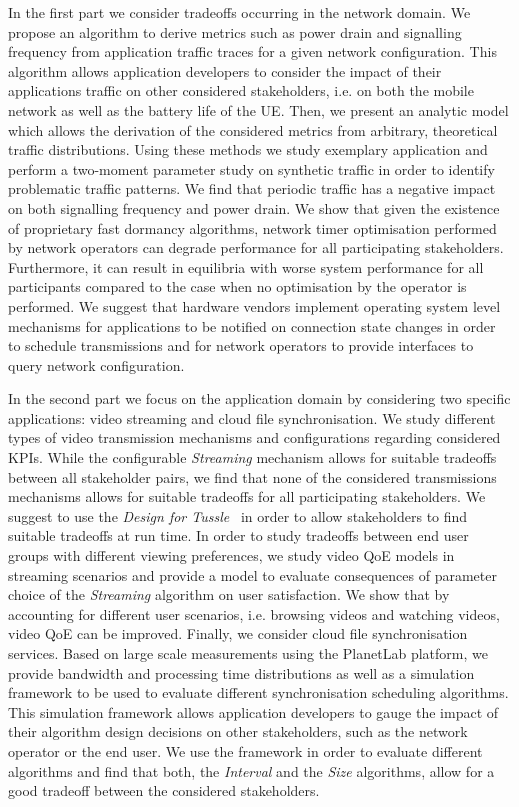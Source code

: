 In the first part we consider tradeoffs occurring in the network domain.
We propose an algorithm to derive metrics such as power drain and signalling frequency from application traffic traces for a given network configuration.
This algorithm allows application developers to consider the impact of their applications  traffic on other considered stakeholders, i.e. on both the mobile network as well as the battery life of the \gls{UE}.
Then, we present an analytic model which allows the derivation of the considered metrics from arbitrary, theoretical traffic distributions.
Using these methods we study exemplary application and perform a two-moment parameter study on synthetic traffic in order to identify problematic traffic patterns.
We find that periodic traffic has a negative impact on both signalling frequency and power drain.
We show that given the existence of proprietary fast dormancy algorithms, network timer optimisation performed by network operators can degrade performance for all participating stakeholders. 
Furthermore, it can result in equilibria with worse system performance for all participants compared to the case when no optimisation by the operator is performed.  
We suggest that hardware vendors implement operating system level mechanisms for applications to be notified on connection state changes in order to schedule transmissions and for network operators to provide interfaces to query network configuration.

In the second part we focus on the application domain by considering two specific applications: video streaming and cloud file synchronisation.
We study different types of video transmission mechanisms and configurations regarding considered \glspl{KPI}.
While the configurable \emph{Streaming} mechanism allows for suitable tradeoffs between all stakeholder pairs, we find that none of the considered transmissions mechanisms allows for suitable tradeoffs for all participating stakeholders.
We suggest to use the \emph{Design for Tussle}~\cite{Clark2005} in order to allow stakeholders to find suitable tradeoffs at run time.
In order to study tradeoffs between end user groups with different viewing preferences, we study video \gls{QoE} models in streaming scenarios and provide a model to evaluate consequences of parameter choice of the \emph{Streaming} algorithm on user satisfaction.
We show that by accounting for different user scenarios, i.e. browsing videos and watching videos, video \gls{QoE} can be improved.
Finally, we consider cloud file synchronisation services.
Based on large scale measurements using the PlanetLab platform, we provide bandwidth and processing time distributions as well as a simulation framework to be used to evaluate different synchronisation scheduling algorithms.
This simulation framework allows application developers to gauge the impact of their algorithm design decisions on other stakeholders, such as the network operator or the end user.
We use the framework in order to evaluate different algorithms and find that both, the \emph{Interval} and the \emph{Size} algorithms, allow for a good tradeoff between the considered stakeholders.


